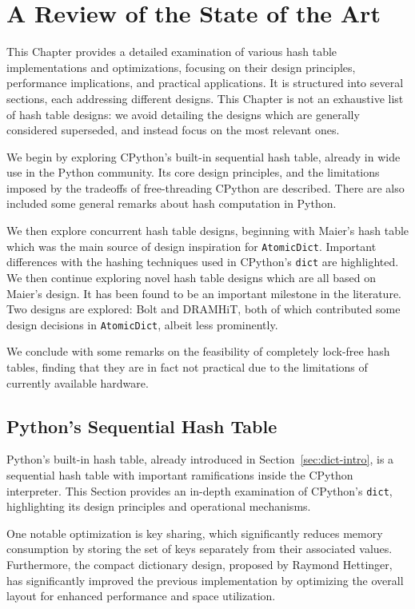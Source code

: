\chapter{A Review of the State of the Art}\label{ch:review}

This Chapter provides a detailed examination of various hash table implementations and optimizations, focusing on their design principles, performance implications, and practical applications.
It is structured into several sections, each addressing different designs.
This Chapter is not an exhaustive list of hash table designs: we avoid detailing the designs which are generally considered superseded, and instead focus on the most relevant ones.

We begin by exploring CPython's built-in sequential hash table, already in wide use in the Python community.
Its core design principles, and the limitations imposed by the tradeoffs of free-threading CPython are described.
There are also included some general remarks about hash computation in Python.

We then explore concurrent hash table designs, beginning with Maier's hash table which was the main source of design inspiration for \texttt{AtomicDict}.
Important differences with the hashing techniques used in CPython's \texttt{dict} are highlighted.
We then continue exploring novel hash table designs which are all based on Maier's design.
It has been found to be an important milestone in the literature.
Two designs are explored: Bolt and DRAMHiT, both of which contributed some design decisions in \texttt{AtomicDict}, albeit less prominently.

We conclude with some remarks on the feasibility of completely lock-free hash tables, finding that they are in fact not practical due to the limitations of currently available hardware.


\section{Python's Sequential Hash Table}\label{sec:python-dict-review}

Python's built-in hash table, already introduced in Section~\ref{sec:dict-intro}, is a sequential hash table with important ramifications inside the CPython interpreter.
This Section provides an in-depth examination of CPython's \texttt{dict}, highlighting its design principles and operational mechanisms.

One notable optimization is key sharing, which significantly reduces memory consumption by storing the set of keys separately from their associated values.
Furthermore, the compact dictionary design, proposed by Raymond Hettinger, has significantly improved the previous implementation by optimizing the overall layout for enhanced performance and space utilization.

